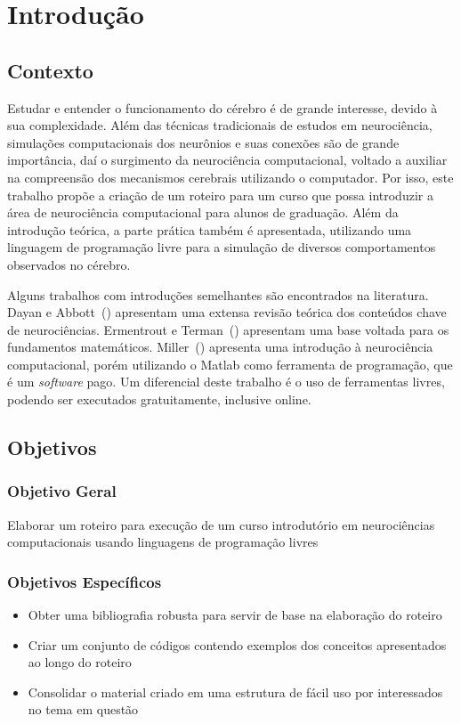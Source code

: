 \chapter{Introdução}\label{cap:introducao}
\section{Contexto}
Estudar e entender o funcionamento do cérebro é de grande interesse, devido à sua complexidade. Além das técnicas tradicionais de estudos em neurociência, simulações computacionais dos neurônios e suas conexões são de grande importância, daí o surgimento da neurociência computacional, voltado a auxiliar na compreensão dos mecanismos cerebrais utilizando o computador. Por isso, este trabalho propõe a criação de um roteiro para um curso que possa introduzir a área de neurociência computacional para alunos de graduação. Além da introdução teórica, a parte prática também é apresentada, utilizando uma linguagem de programação livre para a simulação de diversos comportamentos observados no cérebro.

Alguns trabalhos com introduções semelhantes são encontrados na literatura. Dayan e Abbott~(\citeyear{dayan_theoretical_2001}) apresentam uma extensa revisão teórica dos conteúdos chave de neurociências. Ermentrout e Terman~(\citeyear{ermentrout_mathematical_2010}) apresentam uma base voltada para os fundamentos matemáticos. Miller~(\citeyear{miller_introductory_2018}) apresenta uma introdução à neurociência computacional, porém utilizando o Matlab como ferramenta de programação, que é um \textit{software} pago. Um diferencial deste trabalho é o uso de ferramentas livres, podendo ser executados gratuitamente, inclusive online.

\section{Objetivos}
\subsection{Objetivo Geral}
Elaborar um roteiro para execução de um curso introdutório em neurociências computacionais usando linguagens de programação livres

\subsection{Objetivos Específicos}
\begin{itemize}
\item Obter uma bibliografia robusta para servir de base na elaboração do roteiro
\item Criar um conjunto de códigos contendo exemplos dos conceitos apresentados ao longo do roteiro
\item Consolidar o material criado em uma estrutura de fácil uso por interessados no tema em questão
\end{itemize}

